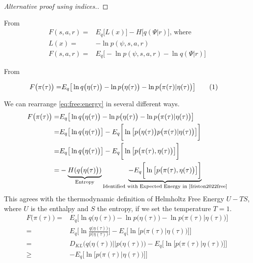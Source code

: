 \documentclass[]{article}
\newcommand\numberthis{\addtocounter{equation}{1}\tag{\theequation}}
\begin{document}
\begin{appendices}
\begin{proof}[Alternative proof using indices.]
	\end{proof}
From \cite{friston2016therefore}
\begin{align*}
	F(s,a,r) =& E_q\big[L(x)\big]-H\big[q(\Psi\vert r)\big] \text{, where}\\
	L(x) =& -\ln{p(\psi,s,a,r)}\\
	F(s,a,r) =&  E_q\big[ -\ln{p(\psi,s,a,r)} - \ln{q(\Psi\vert r)}\big]
\end{align*}

From \cite{friston2022free}

\begin{align*}
	F\big(\pi(\tau)\big) =& E_q\big[\ln q\big(\eta(\tau)\big) - \ln p\big(\eta(\tau)\big) - \ln p\big(\pi(\tau)\vert\eta(\tau)\big)\big] \numberthis \label{eq:free:energy}
\end{align*}

We can rearrange \eqref{eq:free:energy} in several different ways.
\begin{align*}
	F\big(\pi(\tau)\big) =& E_q\big[\ln q\big(\eta(\tau)\big) - \ln p\big(\eta(\tau)\big) - \ln p\big(\pi(\tau)\vert\eta(\tau)\big)\big]\\
	=& E_q\big[\ln q\big(\eta(\tau)\big)\big] - E_q \bigg[\ln \big[p\big(\eta(\tau)\big)  p\big(\pi(\tau)\vert\eta(\tau)\big)\big]\bigg]\\
	=& E_q\big[\ln q\big(\eta(\tau)\big)\big] - E_q \bigg[\ln \big[  p\big(\pi(\tau),\eta(\tau)\big)\big]\bigg]\\
	=&-\underbrace{H(q\big(\eta(\tau)\big))}_\text{Entropy}  \underbrace{- E_q \bigg[\ln \big[  p\big(\pi(\tau),\eta(\tau)\big)\big]\bigg]}_\text{Identified with Expected Energy in \cite{friston2022free}}
\end{align*}
This agrees with the thermodynamic definition of Helmholtz Free Energy $U-TS$, where $U$ is the enthalpy and $S$ the entropy, if we set the temperature $T=1$.
\begin{align*}
	F\big(\pi(\tau)\big) =& E_q\big[\ln q\big(\eta(\tau)\big) - \ln p\big(\eta(\tau)\big) - \ln p\big(\pi(\tau)\vert\eta(\tau)\big)\big]\\
	=& E_q\big[\ln \frac{q\big(\eta(\tau)\big)}{p\big(\eta(\tau)\big)}   \big] - E_q \bigg[\ln \big[  p\big(\pi(\tau)\vert\eta(\tau)\big)\big]\bigg]\\
	=& D_{KL}\big(q\big(\eta(\tau)\big)\vert\vert p\big(\eta(\tau)\big)\big)- E_q \bigg[\ln \big[  p\big(\pi(\tau)\vert\eta(\tau)\big)\big]\bigg]\\
	\ge&- E_q \bigg[\ln \big[  p\big(\pi(\tau)\vert\eta(\tau)\big)\big]\bigg]
\end{align*}


\end{appendices}
\end{document}
